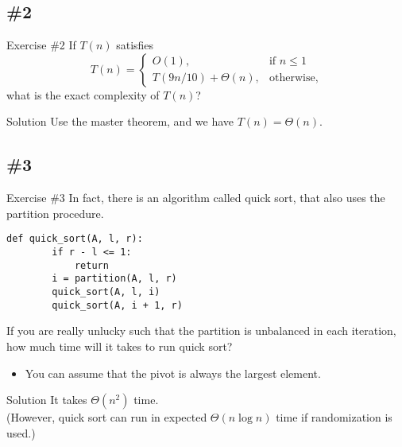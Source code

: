 \documentclass{beamer}
\begin{document}
\subsection{\#2}
\begin{frame}{Exercise \#2}
  If $T(n)$ satisfies
  \begin{equation*}
    T(n) =
    \begin{cases}
      O(1), &\text{if $n \leq 1$} \\
      T(9n/10) + \Theta(n), &\text{otherwise},
    \end{cases}
  \end{equation*}
  what is the exact complexity of $T(n)$? \pause
  \begin{block}{Solution}
    Use the master theorem, and we have $T(n) = \Theta(n)$.
  \end{block}
\end{frame}

\subsection{\#3}
\begin{frame}[fragile]{Exercise \#3}
  In fact, there is an algorithm called quick sort, that also uses the
  partition procedure. \pause
  \begin{block}{}
    \scriptsize
    \begin{lstlisting}[gobble=4]
    def quick_sort(A, l, r):
        if r - l <= 1:
            return
        i = partition(A, l, r)
        quick_sort(A, l, i)
        quick_sort(A, i + 1, r)
    \end{lstlisting}
    \pause
  \end{block}
  If you are really unlucky such that the partition is unbalanced in each
  iteration, how much time will it takes to run quick sort? \pause
  \begin{itemize}
    \item You can assume that the pivot is always the largest element. \pause
  \end{itemize}
  \begin{block}{Solution}
    It takes $\Theta(n^2)$ time. \\
    (However, quick sort can run in expected $\Theta(n \log n)$ time if
    randomization is used.)
  \end{block}
\end{frame}
\end{document}
